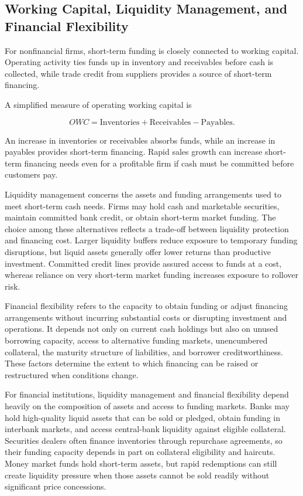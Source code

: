 \subsection{Working Capital, Liquidity Management, and Financial Flexibility}

For nonfinancial firms, short-term funding is closely connected to working capital. Operating activity ties funds up in inventory and receivables before cash is collected, while trade credit from suppliers provides a source of short-term financing.

A simplified measure of operating working capital is

\begin{equation*}
OWC=\text{Inventories}+\text{Receivables}-\text{Payables}.
\label{eq:ch7-operating-working-capital}
\end{equation*}

An increase in inventories or receivables absorbs funds, while an increase in payables provides short-term financing. Rapid sales growth can increase short-term financing needs even for a profitable firm if cash must be committed before customers pay.

Liquidity management concerns the assets and funding arrangements used to meet short-term cash needs. Firms may hold cash and marketable securities, maintain committed bank credit, or obtain short-term market funding. The choice among these alternatives reflects a trade-off between liquidity protection and financing cost. Larger liquidity buffers reduce exposure to temporary funding disruptions, but liquid assets generally offer lower returns than productive investment. Committed credit lines provide assured access to funds at a cost, whereas reliance on very short-term market funding increases exposure to rollover risk.

Financial flexibility refers to the capacity to obtain funding or adjust financing arrangements without incurring substantial costs or disrupting investment and operations. It depends not only on current cash holdings but also on unused borrowing capacity, access to alternative funding markets, unencumbered collateral, the maturity structure of liabilities, and borrower creditworthiness. These factors determine the extent to which financing can be raised or restructured when conditions change.

For financial institutions, liquidity management and financial flexibility depend heavily on the composition of assets and access to funding markets. Banks may hold high-quality liquid assets that can be sold or pledged, obtain funding in interbank markets, and access central-bank liquidity against eligible collateral. Securities dealers often finance inventories through repurchase agreements, so their funding capacity depends in part on collateral eligibility and haircuts. Money market funds hold short-term assets, but rapid redemptions can still create liquidity pressure when those assets cannot be sold readily without significant price concessions.

